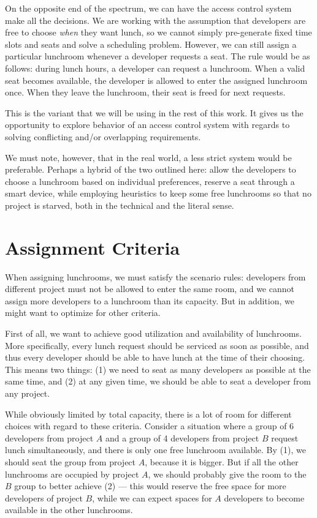 \medskip

On the opposite end of the spectrum, we can have the access control system make all the
decisions. We are working with the assumption that developers are free to choose
\textit{when} they want lunch, so we cannot simply pre-generate fixed time slots and
seats and solve a scheduling problem. However, we can still assign a particular
lunchroom whenever a developer requests a seat. The rule would be as follows: during
lunch hours, a developer can request a lunchroom. When a valid seat becomes available,
the developer is allowed to enter the assigned lunchroom once. When they leave the
lunchroom, their seat is freed for next requests.

This is the variant that we will be using in the rest of this work. It gives us the
opportunity to explore behavior of an access control system with regards to solving
conflicting and/or overlapping requirements.

\medskip

We must note, however, that in the real world, a less strict system would be preferable.
Perhaps a hybrid of the two outlined here: allow the developers to choose a lunchroom
based on individual preferences, reserve a seat through a smart device, while employing
heuristics to keep some free lunchrooms so that no project is starved, both in the
technical and the literal sense.

\section{Assignment Criteria}

When assigning lunchrooms, we must satisfy the scenario rules: developers from
different project must not be allowed to enter the same room, and we cannot assign
more developers to a lunchroom than its capacity. But in addition, we might want to
optimize for other criteria.

First of all, we want to achieve good utilization and availability of lunchrooms. More
specifically, every lunch request should be serviced as soon as possible, and thus every
developer should be able to have lunch at the time of their choosing. This means two
things: (1) we need to seat as many developers as possible at the same time, and (2) at
any given time, we should be able to seat a developer from any project.

While obviously limited by total capacity, there is a lot of room for different choices
with regard to these criteria. Consider a situation where a group of 6 developers from
project $A$ and a group of 4 developers from project $B$ request lunch simultaneously,
and there is only one free lunchroom available. By (1), we should seat the group from
project $A$, because it is bigger. But if all the other lunchrooms are occupied by
project $A$, we should probably give the room to the $B$ group to better achieve (2) ---
this would reserve the free space for more developers of project $B$, while we can
expect spaces for $A$ developers to become available in the other lunchrooms.

